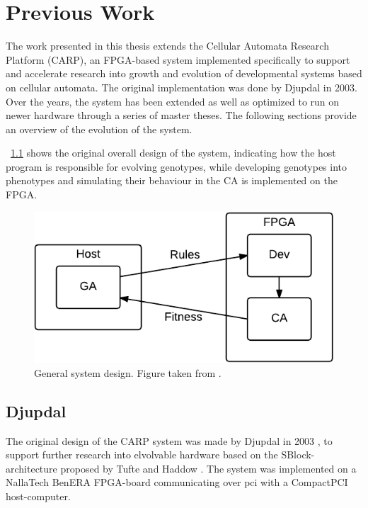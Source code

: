 
\chapter{Previous Work}

The work presented in this thesis extends the Cellular Automata Research
Platform (CARP), an FPGA-based system implemented specifically to support and
accelerate research into growth and evolution of developmental systems based on
cellular automata. The original implementation was done by Djupdal in 2003. Over
the years, the system has been extended as well as optimized to run on newer
hardware through a series of master theses. The following sections provide an
overview of the evolution of the system.

\figurename~\ref{fig:overview-general} shows the original overall design of the
system, indicating how the host program is responsible for evolving genotypes,
while developing genotypes into phenotypes and simulating their behaviour in the
CA is implemented on the FPGA.

\begin{figure}[ht]
  \centering
  \includegraphics[width=0.6\linewidth]{fig/overview-general}
  \caption[General system design]{General system design. Figure taken from \cite{Lundal2015a}.\label{fig:overview-general} }
\end{figure}

%

\section{Djupdal}

The original design of the CARP system was made by Djupdal in 2003
\cite{Djupdal2003}, to support further research into elvolvable hardware based
on the SBlock-architecture proposed by Tufte and Haddow \cite{Haddow2000a}. The
system was implemented on a NallaTech BenERA FPGA-board communicating over
\acrfull{pci} with a CompactPCI host-computer.

